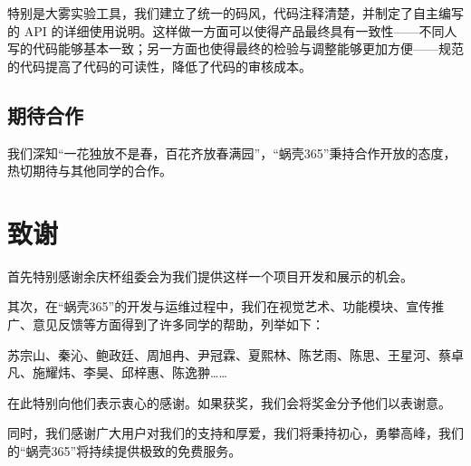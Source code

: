 特别是大雾实验工具，我们建立了统一的码风，代码注释清楚，并制定了自主编写的 API 的详细使用说明。这样做一方面可以使得产品最终具有一致性——不同人写的代码能够基本一致；另一方面也使得最终的检验与调整能够更加方便——规范的代码提高了代码的可读性，降低了代码的审核成本。

\subsection{期待合作}
我们深知“一花独放不是春，百花齐放春满园”，“蜗壳365”秉持合作开放的态度，热切期待与其他同学的合作。

\section{致谢}
首先特别感谢余庆杯组委会为我们提供这样一个项目开发和展示的机会。

其次，在“蜗壳365”的开发与运维过程中，我们在视觉艺术、功能模块、宣传推广、意见反馈等方面得到了许多同学的帮助，列举如下：

苏宗山、秦沁、鲍政廷、周旭冉、尹冠霖、夏熙林、陈艺雨、陈思、王星河、蔡卓凡、施耀炜、李昊、邱梓惠、陈逸翀……

在此特别向他们表示衷心的感谢。如果获奖，我们会将奖金分予他们以表谢意。

同时，我们感谢广大用户对我们的支持和厚爱，我们将秉持初心，勇攀高峰，我们的“蜗壳365”将持续提供极致的免费服务。
